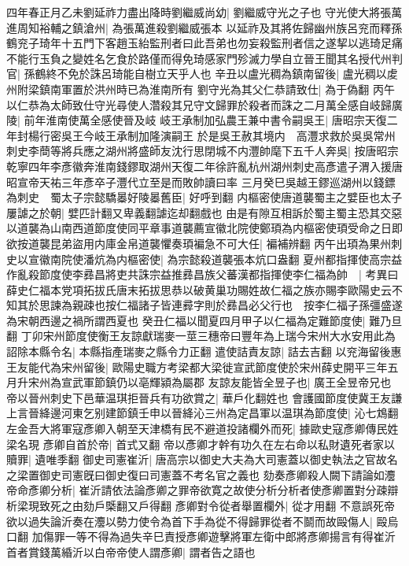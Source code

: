 四年春正月乙未劉延祚力盡出降時劉繼威尚幼|{
	劉繼威守光之子也}
守光使大將張萬進周知裕輔之鎮滄州|{
	為張萬進殺劉繼威張本}
以延祚及其將佐歸幽州族呂兖而釋孫鶴兖子琦年十五門下客趙玉紿監刑者曰此吾弟也勿妄殺監刑者信之遂挈以逃琦足痛不能行玉負之變姓名乞食於路僅而得免琦感家門殄滅力學自立晉王聞其名授代州判官|{
	孫鶴終不免於誅呂琦能自樹立天乎人也}
辛丑以盧光稠為鎮南留後|{
	盧光稠以䖍州附梁鎮南軍置於洪州時已為淮南所有}
劉守光為其父仁恭請致仕|{
	為于偽翻}
丙午以仁恭為太師致仕守光尋使人濳殺其兄守文歸罪於殺者而誅之二月萬全感自岐歸廣陵|{
	前年淮南使萬全感使晉及岐}
岐王承制加弘農王兼中書令嗣吳王|{
	唐昭宗天復二年封楊行密吳王今岐王承制加隆演嗣王}
於是吳王赦其境内　高灃求救於吳吳常州刺史李蕳等將兵應之湖州將盛師友沈行思閉城不内灃帥麾下五千人奔吳|{
	按唐昭宗乾寧四年李彥徽奔淮南錢鏐取湖州天復二年徐許亂杭州湖州刺史高彥遣子渭入援唐昭宣帝天祐三年彥卒子灃代立至是而敗帥讀曰率}
三月癸巳吳越王鏐巡湖州以錢鏢為刺史　蜀太子宗懿驕㬥好陵㬥舊臣|{
	好呼到翻}
内樞密使唐道襲蜀主之嬖臣也太子屢謔之於朝|{
	嬖匹計翻又卑義翻謔迄却翻戲也}
由是有隙互相訴於蜀主蜀主恐其交惡以道襲為山南西道節度使同平章事道襲薦宣徽北院使鄭頊為内樞密使頊受命之日即欲按道襲昆弟盜用内庫金帛道襲懼奏頊褊急不可大任|{
	褊補辨翻}
丙午出頊為果州刺史以宣徽南院使潘炕為内樞密使|{
	為宗懿殺道襲張本炕口盎翻}
夏州都指揮使高宗益作亂殺節度使李彞昌將吏共誅宗益推彞昌族父蕃漢都指揮使李仁福為帥　|{
	考異曰薛史仁福本党項拓拔氏唐末拓拔思恭以破黄巢功賜姓故仁福之族亦賜李歐陽史云不知其於思諫為親疎也按仁福諸子皆連彛字則於彞昌必父行也　按李仁福子孫彊盛遂為宋朝西邊之禍所謂西夏也}
癸丑仁福以聞夏四月甲子以仁福為定難節度使|{
	難乃旦翻}
丁卯宋州節度使衡王友諒獻瑞麥一莖三穗帝曰豐年為上瑞今宋州大水安用此為詔除本縣令名|{
	本縣指產瑞麥之縣令力正翻}
遣使詰責友諒|{
	詰去吉翻}
以兖海留後惠王友能代為宋州留後|{
	歐陽史職方考梁都大梁徙宣武節度使於宋州薛史開平三年五月升宋州為宣武軍節鎮仍以亳輝潁為屬郡}
友諒友能皆全昱子也|{
	廣王全昱帝兄也}
帝以晉州刺史下邑華温琪拒晉兵有功欲賞之|{
	華戶化翻姓也}
會護國節度使冀王友謙上言晉絳邊河東乞别建節鎮壬申以晉絳沁三州為定昌軍以温琪為節度使|{
	沁七鴆翻}
左金吾大將軍寇彥卿入朝至天津橋有民不避道投諸欄外而死|{
	據歐史寇彥卿傳民姓梁名現}
彥卿自首於帝|{
	首式又翻}
帝以彥卿才幹有功久在左右命以私財遺死者家以贖罪|{
	遺唯季翻}
御史司憲崔沂|{
	唐高宗以御史大夫為大司憲蓋以御史執法之官故名之梁置御史司憲旣曰御史復曰司憲蓋不考名官之義也}
劾奏彥卿殺人闕下請論如灋帝命彥卿分析|{
	崔沂請依法論彥卿之罪帝欲寛之故使分析分析者使彥卿置對分疎辯析梁現致死之由劾戶㮣翻又戶得翻}
彥卿對令從者舉置欄外|{
	從才用翻}
不意誤死帝欲以過失論沂奏在灋以勢力使令為首下手為從不得歸罪從者不鬬而故毆傷人|{
	毆烏口翻}
加傷罪一等不得為過失辛巳責授彥卿遊擊將軍左衛中郎將彥卿揚言有得崔沂首者賞錢萬緍沂以白帝帝使人謂彥卿|{
	謂者告之語也}

